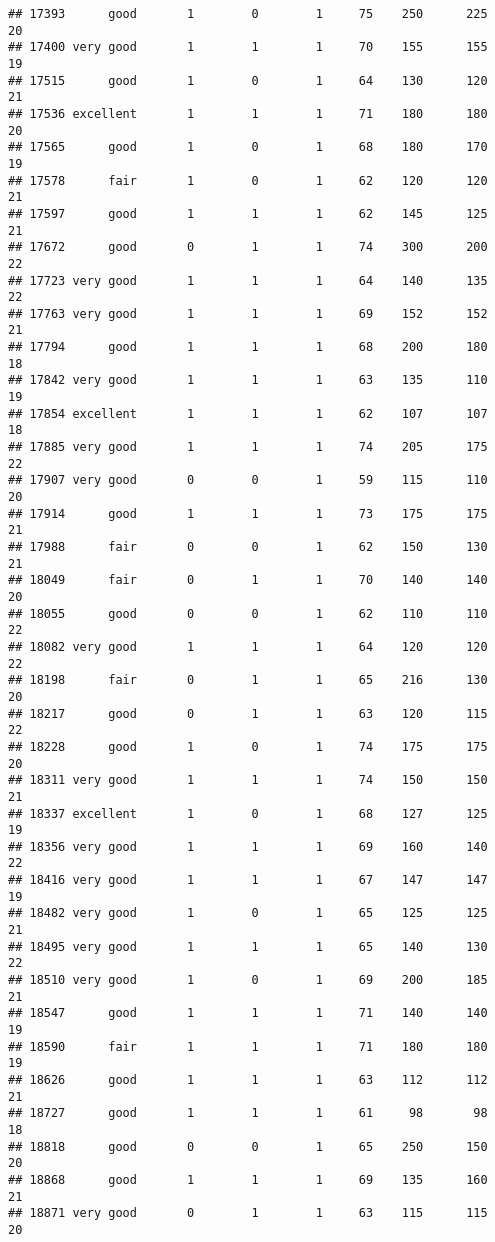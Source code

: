 \documentclass[]{article}
\begin{document}
\begin{verbatim}
## 17393      good       1        0        1     75    250      225  20
## 17400 very good       1        1        1     70    155      155  19
## 17515      good       1        0        1     64    130      120  21
## 17536 excellent       1        1        1     71    180      180  20
## 17565      good       1        0        1     68    180      170  19
## 17578      fair       1        0        1     62    120      120  21
## 17597      good       1        1        1     62    145      125  21
## 17672      good       0        1        1     74    300      200  22
## 17723 very good       1        1        1     64    140      135  22
## 17763 very good       1        1        1     69    152      152  21
## 17794      good       1        1        1     68    200      180  18
## 17842 very good       1        1        1     63    135      110  19
## 17854 excellent       1        1        1     62    107      107  18
## 17885 very good       1        1        1     74    205      175  22
## 17907 very good       0        0        1     59    115      110  20
## 17914      good       1        1        1     73    175      175  21
## 17988      fair       0        0        1     62    150      130  21
## 18049      fair       0        1        1     70    140      140  20
## 18055      good       0        0        1     62    110      110  22
## 18082 very good       1        1        1     64    120      120  22
## 18198      fair       0        1        1     65    216      130  20
## 18217      good       0        1        1     63    120      115  22
## 18228      good       1        0        1     74    175      175  20
## 18311 very good       1        1        1     74    150      150  21
## 18337 excellent       1        0        1     68    127      125  19
## 18356 very good       1        1        1     69    160      140  22
## 18416 very good       1        1        1     67    147      147  19
## 18482 very good       1        0        1     65    125      125  21
## 18495 very good       1        1        1     65    140      130  22
## 18510 very good       1        0        1     69    200      185  21
## 18547      good       1        1        1     71    140      140  19
## 18590      fair       1        1        1     71    180      180  19
## 18626      good       1        1        1     63    112      112  21
## 18727      good       1        1        1     61     98       98  18
## 18818      good       0        0        1     65    250      150  20
## 18868      good       1        1        1     69    135      160  21
## 18871 very good       0        1        1     63    115      115  20

\end{verbatim}
\end{document}

